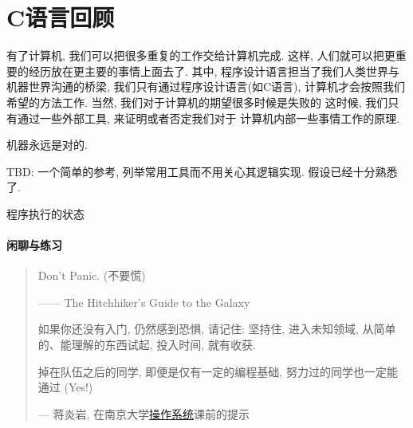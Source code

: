 \part{C语言回顾}

有了计算机, 我们可以把很多重复的工作交给计算机完成.
这样, 人们就可以把更重要的经历放在更主要的事情上面去了. 
其中, 程序设计语言担当了我们人类世界与机器世界沟通的桥梁, 
我们只有通过程序设计语言(如C语言), 计算机才会按照我们
希望的方法工作. 当然, 我们对于计算机的期望很多时候是失败的
这时候, 我们只有通过一些外部工具, 来证明或者否定我们对于
计算机内部一些事情工作的原理. 

\begin{axiom}
    机器永远是对的. 
\end{axiom}

TBD: 一个简单的参考, 列举常用工具而不用关心其逻辑实现. 假设已经十分熟悉
了. 

 程序执行的状态 

 

\subsection*{闲聊与练习}

\begin{quote}

      Don't Panic. (不要慌) 
    
    \hfill—— The Hitchhiker's Guide to the Galaxy

    如果你还没有入门, 仍然感到恐惧, 请记住: 坚持住, 进入未知领域, 从简单的、能理解的东西试起, 
    投入时间, 就有收获. 
    
    掉在队伍之后的同学, 即便是仅有一定的编程基础, 努力过的同学也一定能通过 (Yes!)

    \hfill --- 蒋炎岩, 在南京大学\href{http://jyywiki.cn/OS/OS_Guide}{操作系统}课前的提示
\end{quote}